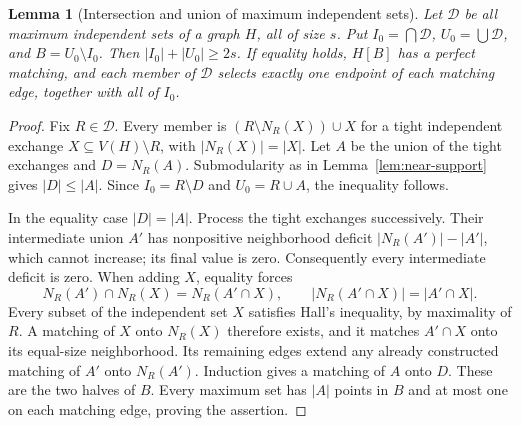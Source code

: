\documentclass[11pt]{article}
\newtheorem{lemma}[theorem]{Lemma}
\theoremstyle{definition}
\theoremstyle{plain}
\begin{document}
\begin{lemma}[Intersection and union of maximum independent sets]\label{lem:max-family}
Let $\mathcal D$ be all maximum independent sets of a graph $H$,
all of size $s$. Put $I_0=\bigcap\mathcal D$, $U_0=\bigcup\mathcal D$,
and $B=U_0\setminus I_0$. Then $|I_0|+|U_0|\ge2s$.
If equality holds, $H[B]$ has a perfect matching, and each member
of $\mathcal D$ selects exactly one endpoint of each matching edge,
together with all of $I_0$.
\end{lemma}
\begin{proof}
Fix $R\in\mathcal D$. Every member is
$(R\setminus N_R(X))\cup X$ for a tight independent exchange
$X\subseteq V(H)\setminus R$, with $|N_R(X)|=|X|$.
Let $A$ be the union of the tight exchanges and $D=N_R(A)$.
Submodularity as in Lemma~\ref{lem:near-support} gives $|D|\le|A|$.
Since $I_0=R\setminus D$ and $U_0=R\cup A$, the inequality follows.

In the equality case $|D|=|A|$. Process the tight exchanges successively.
Their intermediate union $A'$ has nonpositive neighborhood deficit
$|N_R(A')|-|A'|$, which cannot increase; its final value is zero.
Consequently every intermediate deficit is zero. When adding $X$,
equality forces
\[
 N_R(A')\cap N_R(X)=N_R(A'\cap X),\qquad
 |N_R(A'\cap X)|=|A'\cap X|.
\]
Every subset of the independent set $X$ satisfies Hall's inequality,
by maximality of $R$. A matching of $X$ onto $N_R(X)$ therefore exists,
and it matches $A'\cap X$ onto its equal-size neighborhood.
Its remaining edges extend any already constructed matching of
$A'$ onto $N_R(A')$. Induction gives a matching of $A$ onto $D$.
These are the two halves of $B$. Every maximum set has $|A|$ points
in $B$ and at most one on each matching edge, proving the assertion.
\end{proof}
\end{document}
